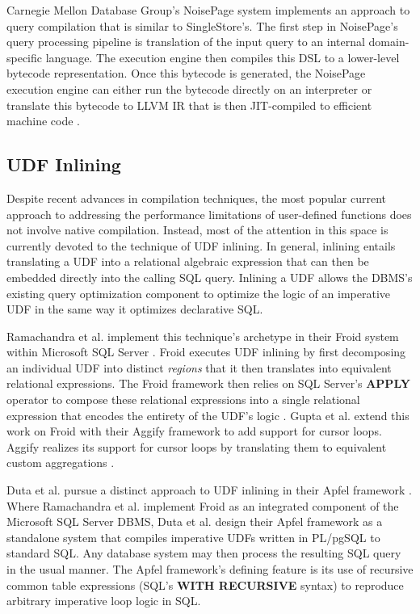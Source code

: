 \documentclass{vldb}
\newcommand{\dbCode}[1]{{\sffamily\small \textbf{#1}}\xspace}
\begin{document}
Carnegie Mellon Database Group's NoisePage system implements an approach to query compilation that is similar to SingleStore's. The first step in NoisePage's query processing pipeline is translation of the input query to an internal domain-specific language. The execution engine then compiles this DSL to a lower-level bytecode representation. Once this bytecode is generated, the NoisePage execution engine can either run the bytecode directly on an interpreter or translate this bytecode to LLVM IR that is then JIT-compiled to efficient machine code \cite{pcq}.

\subsection{UDF Inlining}

Despite recent advances in compilation techniques, the most popular current approach to addressing the performance limitations of user-defined functions does not involve native compilation. Instead, most of the attention in this space is currently devoted to the technique of UDF inlining. In general, inlining entails translating a UDF into a relational algebraic expression that can then be embedded directly into the calling SQL query. Inlining a UDF allows the DBMS's existing query optimization component to optimize the logic of an imperative UDF in the same way it optimizes declarative SQL.

Ramachandra et al. implement this technique's archetype in their Froid system within Microsoft SQL Server \cite{sqlserver}. Froid executes UDF inlining by first decomposing an individual UDF into distinct \textit{regions} that it then translates into equivalent relational expressions. The Froid framework then relies on SQL Server's \dbCode{APPLY} operator to compose these relational expressions into a single relational expression that encodes the entirety of the UDF's logic \cite{froid}. Gupta et al. extend this work on Froid with their Aggify framework to add support for cursor loops. Aggify realizes its support for cursor loops by translating them to equivalent custom aggregations \cite{aggify}. 

Duta et al. pursue a distinct approach to UDF inlining in their Apfel framework \cite{apfel}. Where Ramachandra et al. implement Froid as an integrated component of the Microsoft SQL Server DBMS, Duta et al. design their Apfel framework as a standalone system that compiles imperative UDFs written in PL/pgSQL \cite{plpgsql} to standard SQL. Any database system may then process the resulting SQL query in the usual manner. The Apfel framework's defining feature is its use of recursive common table expressions (SQL's \dbCode{WITH RECURSIVE} syntax) to reproduce arbitrary imperative loop logic in SQL.
\end{document}
